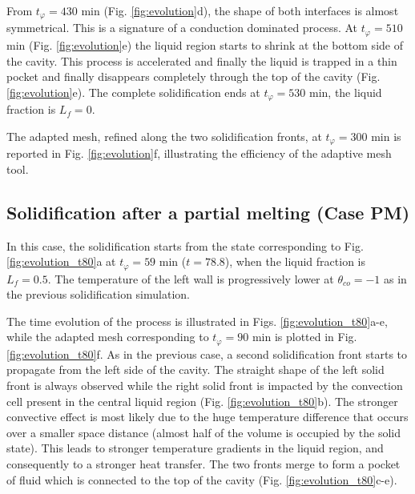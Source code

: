 \noindent From $t_{\varphi} = 430$ min (Fig. \ref{fig:evolution}d), the shape of both interfaces is almost symmetrical. 
This is a signature of a conduction dominated process. 
At $t_{\varphi} = 510$ min (Fig. \ref{fig:evolution}e) the liquid region starts to shrink at the bottom side of the cavity. 
This process is accelerated and finally the liquid is trapped in a thin pocket and finally disappears completely through the top of the cavity (Fig. \ref{fig:evolution}e). 
The complete solidification ends at $t_{\varphi} = 530$ min, \ie the liquid fraction is $L_f=0$.  

\noindent The adapted mesh, refined along the two solidification fronts, at $t_{\varphi} = 300$ min is reported in Fig. \ref{fig:evolution}f, illustrating the efficiency of the adaptive mesh tool.


\subsection{Solidification after a partial melting (Case PM)} \label{sec_solid_partial} 

In this case, the solidification starts from the state corresponding to Fig. \ref{fig:evolution_t80}a at $t_{\varphi} = 59$ min ($t=78.8$), when the liquid fraction is $L_f = 0.5$. 
The temperature of the left wall is progressively lower at $\theta_{co}=-1$ as in the previous solidification simulation.  

The time evolution of the process is illustrated in Figs. \ref{fig:evolution_t80}a-e, while the adapted mesh corresponding to $t_{\varphi} = 90$ min is plotted in Fig. \ref{fig:evolution_t80}f. 
As in the previous case, a second  solidification front starts to propagate from the left side of the cavity. 
The straight shape of the left solid front is always observed while the right solid front is impacted by the convection cell present in the central liquid region (Fig. \ref{fig:evolution_t80}b). 
The stronger convective effect is most likely due to the huge temperature difference that occurs over a smaller space distance (almost half of the volume is occupied by the solid state). 
This leads to stronger temperature gradients in the liquid region, and consequently to a stronger heat transfer. 
The two fronts merge to form a pocket of fluid which is connected to the top of the cavity (Fig. \ref{fig:evolution_t80}c-e). 

